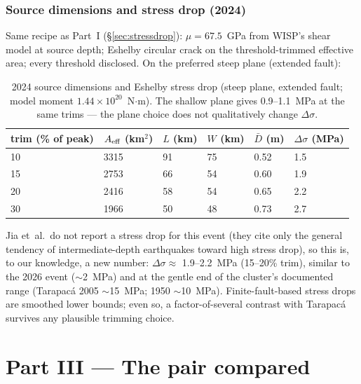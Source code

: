 \documentclass[11pt]{article}
\begin{document}
\section{Source dimensions and stress drop (2024)}
\label{sec:stress2024}
Same recipe as Part~I (\S\ref{sec:stressdrop}): $\mu = 67.5$~GPa from WISP's shear model at
source depth; Eshelby circular crack on the threshold-trimmed effective area; every threshold
disclosed. On the preferred steep plane (extended fault):
\begin{table}[H]\centering\small
\begin{tabular}{llllll}
\toprule
trim (\% of peak) & $A_{\rm eff}$ (km$^2$) & $L$ (km) & $W$ (km) & $\bar D$ (m) & $\Delta\sigma$ (MPa) \\
\midrule
10 & 3315 & 91 & 75 & 0.52 & 1.5 \\
15 & 2753 & 66 & 54 & 0.60 & 1.9 \\
20 & 2416 & 58 & 54 & 0.65 & 2.2 \\
30 & 1966 & 50 & 48 & 0.73 & 2.7 \\
\bottomrule
\end{tabular}
\caption{2024 source dimensions and Eshelby stress drop (steep plane, extended fault; model
moment $1.44\times10^{20}$~N$\cdot$m). The shallow plane gives 0.9--1.1~MPa at the same trims
--- the plane choice does not qualitatively change $\Delta\sigma$.}
\label{tab:stress2024}
\end{table}

Jia et~al.\ do not report a stress drop for this event (they cite only the general tendency
of intermediate-depth earthquakes toward high stress drop), so this is, to our knowledge, a
new number: $\Delta\sigma \approx$ 1.9--2.2~MPa (15--20\% trim), similar to the 2026 event
($\sim$2~MPa) and at the gentle end of the cluster's documented range (Tarapac\'a 2005
$\sim$15~MPa; 1950 $\sim$10~MPa). Finite-fault-based stress drops are smoothed lower bounds;
even so, a factor-of-several contrast with Tarapac\'a survives any plausible trimming choice.

\part*{Part III --- The pair compared}
\end{document}
